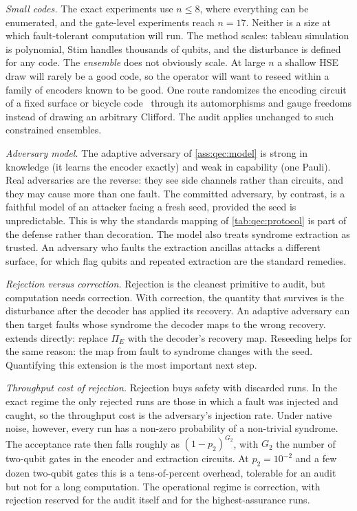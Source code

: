 \emph{Small codes.} The exact experiments use $n\le 8$, where everything can be enumerated, and the gate-level experiments reach $n=17$. Neither is a size at which fault-tolerant computation will run. The method scales: tableau simulation is polynomial, Stim handles thousands of qubits, and the disturbance is defined for any code. The \emph{ensemble} does not obviously scale. At large $n$ a shallow HSE draw will rarely be a good code, so the operator will want to reseed within a family of encoders known to be good. One route randomizes the encoding circuit of a fixed surface or bicycle code~\cite{fowler2012surfacecodes,bravyi2024bicycle} through its automorphisms and gauge freedoms instead of drawing an arbitrary Clifford. The audit applies unchanged to such constrained ensembles.

\emph{Adversary model.} The adaptive adversary of \cref{ass:qec:model} is strong in knowledge (it learns the encoder exactly) and weak in capability (one Pauli). Real adversaries are the reverse: they see side channels rather than circuits, and they may cause more than one fault. The committed adversary, by contrast, is a faithful model of an attacker facing a fresh seed, provided the seed is unpredictable. This is why the standards mapping of \cref{tab:qec:protocol} is part of the defense rather than decoration. The model also treats syndrome extraction as trusted. An adversary who faults the extraction ancillas attacks a different surface, for which flag qubits and repeated extraction are the standard remedies.

\emph{Rejection versus correction.} Rejection is the cleanest primitive to audit, but computation needs correction. With correction, the quantity that survives is the disturbance after the decoder has applied its recovery. An adaptive adversary can then target faults whose syndrome the decoder maps to the wrong recovery.  extends directly: replace $\Pi_E$ with the decoder's recovery map. Reseeding helps for the same reason: the map from fault to syndrome changes with the seed. Quantifying this extension is the most important next step.

\emph{Throughput cost of rejection.} Rejection buys safety with discarded runs. In the exact regime the only rejected runs are those in which a fault was injected and caught, so the throughput cost is the adversary's injection rate. Under native noise, however, every run has a non-zero probability of a non-trivial syndrome. The acceptance rate then falls roughly as $(1-p_2)^{G_2}$, with $G_2$ the number of two-qubit gates in the encoder and extraction circuits. At $p_2=10^{-2}$ and a few dozen two-qubit gates this is a tens-of-percent overhead, tolerable for an audit but not for a long computation. The operational regime is correction, with rejection reserved for the audit itself and for the highest-assurance runs.

